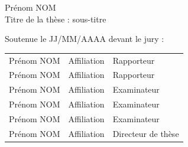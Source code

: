 \begin{titlepage}
\begin{flushleft}
\begin{center}
        \Large Prénom NOM\\
        \vspace{1cm}
        \large Titre de la thèse : sous-titre\\
    \end{center}
	\vspace{3.5cm}
    \normalsize Soutenue le JJ/MM/AAAA devant le jury :\\
\end{flushleft}
\vspace{0.4cm}
\begin{tabular}{lll}
	Prénom NOM & Affiliation & Rapporteur \\
    \vspace{0.08cm}
	Prénom NOM & Affiliation & Rapporteur \\
    \vspace{0.08cm}
	Prénom NOM & Affiliation & Examinateur \\
    \vspace{0.08cm}
	Prénom NOM & Affiliation & Examinateur \\
    \vspace{0.08cm}
	Prénom NOM & Affiliation & Examinateur \\
    \vspace{0.08cm}
	Prénom NOM & Affiliation & Directeur de thèse \\
\end{tabular}

\end{titlepage}
